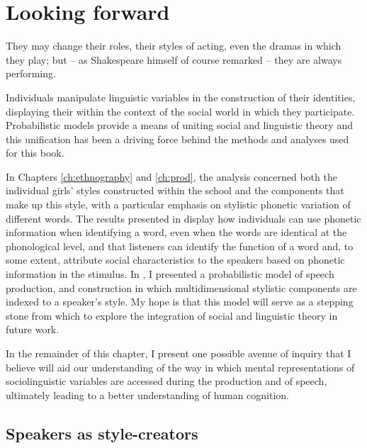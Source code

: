 \chapter{Looking forward}
\label{ch:concl}


\epigraph{They may change their roles, their styles of acting, even the dramas in which they play; but -- as Shakespeare himself of course remarked -- they are always performing.}{\citep[35--36]{geertz1973}} 

\noindent Individuals manipulate linguistic variables in the construction of their identities, displaying their  within the context of the social world in which they participate.  Probabilistic models provide a means of uniting social and linguistic theory and this unification has been a driving force behind the methods and analyses used for this book.  

In Chapters \ref{ch:ethnography} and \ref{ch:prod}, the analysis concerned both the individual girls' styles constructed within the school and the components that make up this style, with a particular emphasis on stylistic phonetic variation of different words.  The results presented in  display how individuals can use phonetic information when identifying a word, even when the words are identical at the phonological level, and that listeners can identify the function of a word and, to some extent, attribute social characteristics to the speakers based on phonetic information in the stimulus.  In , I presented a probabilistic model of speech production,  and  construction in which multidimensional stylistic components are indexed to a speaker's style.  My hope is that this model will serve as a stepping stone from which to explore the integration of social and linguistic theory in future work.  

In the remainder of this chapter, I present one possible avenue of inquiry that I believe will aid our understanding of the way in which mental representations of sociolinguistic variables are accessed during the production and  of speech, ultimately leading to a better understanding of human cognition.

 

\section{Speakers as style-creators}

